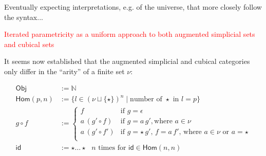 \documentclass[12pt,landscape]{article}
\newcommand{\sort}[1]{\mathsf{Type}_{#1}}
\begin{document}
\begin{Large}
\begin{sf}
\vspace{5cm}

Eventually expecting interpretations, e.g. of the universe, that more closely follow the syntax...

\iffalse
\newpage

\begin{center}
\textcolor{red}{\huge Building presheaves in indexed form directly}
\end{center}

The indexed definitions may look more complicated (the indexed
definition is in charge of ensuring the coherence laws while in the
fibred case, only concrete instances of presheaf are in charge to do so)

The indexed definition is expected to have specific definitional
property. For instance, a (cubical) line between presheaves $A$ and
$B$ in the universe presheaf is not any more a presheaf over $A$ and
$B$ but a presheaf dependent over $A$ and $B$, the same way as $A
\times B \rightarrow \sort{}$ would be (intuitively) interpreted.
\fi

\newpage

\begin{center}
\textcolor{red}{\huge Iterated parametricity as a uniform approach to both augmented simplicial sets and cubical sets}
\end{center}

It seems now established that the augmented simplicial and cubical
categories only differ in the ``arity'' of a finite set $\nu$:

\newcommand{\Obj}{\ensuremath{\mathsf{Obj}}}
\newcommand{\Hom}{\ensuremath{\mathsf{Hom}}}
\newcommand{\id}{\ensuremath{\mathsf{id}}}
$$
  \begin{array}{ll}
    \Obj       & := \mathbb{N}\\
    \Hom(p, n) & := \{l \in (\nu \sqcup \{\star\})^n \mid \text{number of $\star$ in $l = p$}\} \\
    g \circ f             & :=
    \begin{cases}
      f                & \text{if $g = \epsilon$}                                                   \\
      a\,(g' \circ f)  & \text{if $g = a\,g'$}, \text{where $a \in \nu$}                            \\
      a\,(g' \circ f') & \text{if $g = \star\,g'$, $f = a\,f'$, where $a \in \nu$ or $a = \star$} \\
    \end{cases}            \\
    \id                   & := \star \ldots \star \text{ $n$ times for $\id \in \Hom(n, n)$}
  \end{array}
$$


\end{sf}
\end{Large}
\end{document}
